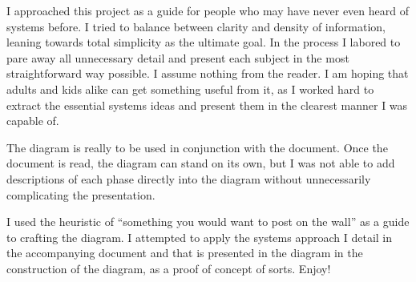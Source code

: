 \documentclass[11pt]{article}
\begin{document}
\maketitle

I approached this project as a guide for people who may have never even heard of systems before.  I tried to balance between clarity and density of information, leaning towards total simplicity as the ultimate goal.  In the process I labored to pare away all unnecessary detail and present each subject in the most straightforward way possible.  I assume nothing from the reader.  I am hoping that adults and kids alike can get something useful from it, as I worked hard to extract the essential systems ideas and present them in the clearest manner I was capable of.

The diagram is really to be used in conjunction with the document.  Once the document is read, the diagram can stand on its own, but I was not able to add descriptions of each phase directly into the diagram without unnecessarily complicating the presentation.  

I used the heuristic of ``something you would want to post on the wall'' as a guide to crafting the diagram.  I attempted to apply the systems approach I detail in the accompanying document and that is presented in the diagram in the construction of the diagram, as a proof of concept of sorts.  Enjoy!
\end{document}

